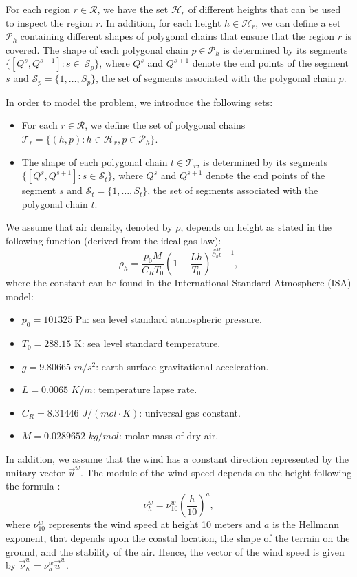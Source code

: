 \documentclass[12pt]{elsarticle}
\newcommand{\CV}[1]{{\color{blue}#1}}
\begin{document}
For each region $r\in\mathcal R$, we have the set $\mathcal H_r$ of different heights that can be used to inspect the region $r$. In addition, for each height $h\in\mathcal H_r$, we can define a set $\mathcal P_{h}$ containing different shapes of polygonal chains that ensure that the region $r$ is covered. The shape of each polygonal chain $p\in\mathcal P_{h}$ is determined by its segments $\{[Q^s,Q^{s+1}]:s\in\ \mathcal S_p\}$, where $Q^s$ and $Q^{s+1}$ denote the end points of the segment $s$ and $\mathcal S_p=\{1,\ldots,S_p\}$, the set of segments associated with the polygonal chain $p$. \CV{In order to model the problem, we introduce the following sets:

\begin{itemize}
    \item For each $r\in\mathcal R$, we define the set of polygonal chains $\mathcal T_r=\{(h, p):h\in\mathcal H_r, p\in\mathcal P_h\}.$
    \item The shape of each polygonal chain $t\in\mathcal T_r$, is determined by its segments $\{[Q^s, Q^{s+1}]:s\in\mathcal S_t\}$, where $Q^s$ and $Q^{s+1}$ denote the end points of the segment $s$ and $\mathcal S_t=\{1,\ldots,S_t\}$, the set of segments associated with the polygonal chain $t$.
\end{itemize}

}

We assume that air density, denoted by $\rho$, depends on height as stated in the following function (derived from the ideal gas law):
$$
\rho_h=\frac{p_0 M}{C_RT_0}\left(1-\frac{Lh}{T_0}\right)^{\frac{gM}{C_RL}-1},
$$
where the constant can be found in the International Standard Atmosphere (ISA) model:
\begin{itemize}
    \item $p_0=101325$ Pa: sea level standard atmospheric pressure.
    \item $T_0=288.15$ K: sea level standard temperature.
    \item $g=9.80665$ $m/s^2$: earth-surface gravitational acceleration.
    \item $L=0.0065$ $K/m$: temperature lapse rate.
    \item $C_R=8.31446$ $J/(mol\cdot K)$: universal gas constant.
    \item $M=0.0289652$ $kg/mol$: molar mass of dry air.
\end{itemize}

In addition, we assume that the wind has a constant direction represented by the unitary vector $\vec{u}^w$. The module of the wind speed depends on the height following the formula \cite{heier2014grid}:
$$
\nu^w_h=\nu^w_{10}\left(\frac{h}{10}\right)^a,
$$
where $\nu^w_{10}$ represents the wind speed at height 10 meters and $a$ is the Hellmann exponent, that depends upon the coastal location, the shape of the terrain on the ground, and the stability of the air. Hence, the vector of the wind speed is given by $\vec{\nu}_h^w=\nu^w_h \vec{u}^w$.
\end{document}
